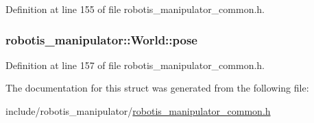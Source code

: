 Definition at line 155 of file robotis\+\_\+manipulator\+\_\+common.\+h.

\subsubsection[{\texorpdfstring{pose}{pose}}]{ robotis\+\_\+manipulator\+::\+World\+::pose}\hypertarget{structrobotis__manipulator_1_1_world_ac396be42979a8e6537638e8f552b3144}{}\label{structrobotis__manipulator_1_1_world_ac396be42979a8e6537638e8f552b3144}


Definition at line 157 of file robotis\+\_\+manipulator\+\_\+common.\+h.



The documentation for this struct was generated from the following file\+:\begin{DoxyCompactItemize}
\item 
include/robotis\+\_\+manipulator/\hyperlink{robotis__manipulator__common_8h}{robotis\+\_\+manipulator\+\_\+common.\+h}\end{DoxyCompactItemize}
